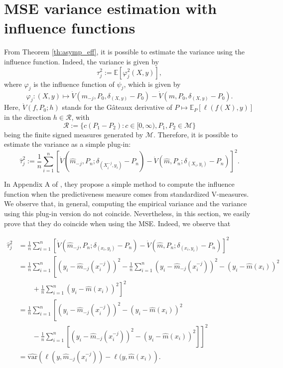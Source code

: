 \documentclass{article}
\theoremstyle{plain}
\theoremstyle{definition}
\theoremstyle{remark}
\begin{document}
\section{MSE variance estimation with influence functions}\label{sect:MSE_if}

From Theorem \ref{th:asymp_eff}, it is possible to estimate the variance using the influence function. Indeed, the variance is given by 
\[
\tau_j^2 := \mathbb{E}\left[\varphi_j^2(X, y)\right],
\]
where $\varphi_j$ is the influence function of $\psi_j$, which is given by 
\[
\varphi_j: (X,y) \mapsto \dot{V}(m_{-j}, P_0, \delta_{(X,y)} - P_0) - \dot{V}(m, P_0, \delta_{(X,y)} - P_0).
\]
Here, $\dot{V}(f, P_0; h)$ stands for the Gâteaux derivative of $P \mapsto \mathbb{E}_P\left[\ell(f(X), y)\right]$ in the direction $h \in \mathcal{R}$, with 
\[
\mathcal{R} := \{c(P_1 - P_2) : c \in [0, \infty), P_1, P_2 \in \mathcal{M}\}
\]
being the finite signed measures generated by $\mathcal{M}$. Therefore, it is possible to estimate the variance as a simple plug-in:
\[
\widehat{\tau}^2_j := \frac{1}{n}\sum_{i=1}^n \left[\dot{V}(\widehat{m}_{-j}, P_n; \delta_{(X^{-j}_i, y_i)} - P_n) - \dot{V}(\widehat{m}, P_n; \delta_{(X_i,y_i)} - P_n)\right]^2.
\]

In Appendix A of \citet{williamson2023general}, they propose a simple method to compute the influence function when the predictiveness measure comes from standardized V-measures. We observe that, in general, computing the empirical variance and the variance using this plug-in version do not coincide. Nevertheless, in this section, we easily prove that they do coincide when using the MSE. Indeed, we observe that
 
\begin{align*}
    \widehat{\tau}^2_j&=\frac{1}{n}\sum_{i=1}^n\left[\dot{V}(\widehat{m}_{-j}, P_n; \delta_{(x_i, y_i)}-P_n)-\dot{V}(\widehat{m}, P_n; \delta_{(x_i, y_i)}-P_n)\right]^2\\
    &=\frac{1}{n}\sum_{i=1}^n\left[\left(y_i-\widehat{m}_{-j}(x^{-j}_i)\right)^2-\frac{1}{n}\sum_{i=1}^n\left(y_i-\widehat{m}_{-j}(x^{-j}_i)\right)^2-\left(y_i-\widehat{m}(x_i)\right)^2\right.\\ &\left.\qquad+\frac{1}{n}\sum_{i=1}^n\left(y_i-\widehat{m}(x_i)\right)^2\right]^2
    \\
    &=\frac{1}{n}\sum_{i=1}^n\left[\left(y_i-\widehat{m}_{-j}(x_i^{-j})\right)^2-\left(y_i-\widehat{m}(x_i)\right)^2\right.\\ &\left.\qquad-\frac{1}{n}\sum_{i=1}^n\left[\left(y_i-\widehat{m}_{-j}(x_i^{-j})\right)^2-\left(y_i-\widehat{m}(x_i)\right)^2\right]\right]^2\\
    &= \widehat{\mathrm{var}}\left(\ell(y, \widehat{m}_{-j}(x_i^{-j}))-\ell(y, \widehat{m}(x_i)\right).
\end{align*}
\end{document}
